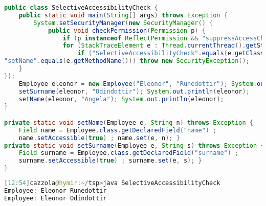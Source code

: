 \begin{lstlisting}[language=Java]
public class SelectiveAccessibilityCheck {
	public static void main(String[] args) throws Exception {
		System.setSecurityManager(new SecurityManager() {
			public void checkPermission(Permission p) {
				if (p instanceof ReflectPermission && "suppressAccessChecks".equals(p.getName()))
				for (StackTraceElement e : Thread.currentThread().getStackTrace())
					if ("SelectiveAccessibilityCheck".equals(e.getClassName()) &&
"setName".equals(e.getMethodName())) throw new SecurityException();
	}
});
	Employee eleonor = new Employee("Eleonor", "Runedottir"); System.out.println(eleonor);
	setSurname(eleonor, "Odindottir"); System.out.println(eleonor);
	setName(eleonor, "Angela"); System.out.println(eleonor);
}

private static void setName(Employee e, String n) throws Exception {
	Field name = Employee.class.getDeclaredField("name") ;
	name.setAccessible(true) ; name.set(e, n); }
private static void setSurname(Employee e, String s) throws Exception {
	Field surname = Employee.class.getDeclaredField("surname") ;
	surname.setAccessible(true) ; surname.set(e, s); }
}
\end{lstlisting}

\begin{lstlisting}[language=Java]
[12:54]cazzola@hymir:~/tsp>java SelectiveAccessibilityCheck
Employee: Eleonor Runedottir
Employee: Eleonor Odindottir
\end{lstlisting}